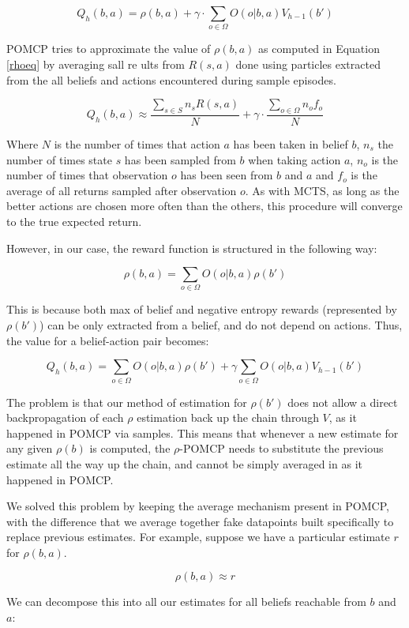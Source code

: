 \[ Q_h(b,a) = \rho(b,a) + \gamma \cdot \sum_{o\in \Omega} O(o|b,a) V_{h-1}(b') \]

POMCP tries to approximate the value of $\rho(b,a)$ as computed in Equation \ref{rhoeq} by averaging
sall re ults from $R(s,a)$ done using particles extracted from the all beliefs and actions
encountered during sample episodes.

\[ Q_h(b,a) \approx \frac{\sum_{s \in S} n_s R(s,a)}{N} + \gamma \cdot \frac{\sum_{o\in \Omega} n_o f_o}{N} \]

Where $N$ is the number of times that action $a$ has been taken in belief $b$, $n_s$ the number of
times state $s$ has been sampled from $b$ when taking action $a$, $n_o$ is the number of times that
observation $o$ has been seen from $b$ and $a$ and $f_o$ is the average of all returns sampled after
observation $o$. As with MCTS, as long as the better actions are chosen more often than the others,
this procedure will converge to the true expected return.

However, in our case, the reward function is structured in the following way:

\[ \rho(b,a) = \sum_{o\in \Omega} O(o | b, a) \rho(b') \]

This is because both max of belief and negative entropy rewards (represented by $\rho(b')$) can be
only extracted from a belief, and do not depend on actions. Thus, the value for a belief-action pair
becomes:

\[ Q_h(b,a) = \sum_{o\in \Omega} O(o | b,a) \rho(b') + \gamma\sum_{o\in\Omega} O(o|b,a) V_{h-1}(b') \]

The problem is that our method of estimation for $\rho(b')$ does not allow a direct backpropagation
of each $\rho$ estimation back up the chain through $V$, as it happened in POMCP via samples. This
means that whenever a new estimate for any given $\rho(b)$ is computed, the $\rho$-POMCP needs to
substitute the previous estimate all the way up the chain, and cannot be simply averaged in as it
happened in POMCP.

We solved this problem by keeping the average mechanism present in POMCP, with the difference that
we average together fake datapoints built specifically to replace previous estimates. For
example, suppose we have a particular estimate $r$ for $\rho(b, a)$.

\[ \rho(b,a) \approx r \]

We can decompose this into all our estimates for all beliefs reachable from $b$ and $a$:

